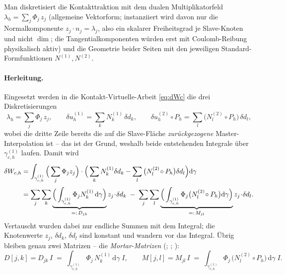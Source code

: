 \documentclass[a4paper,11pt]{article}
\def\bm#1{#1}%
\begin{document}
Man diskretisiert die Kontakttraktion mit dem dualen Multiplikatorfeld
$\bm\lambda_h = \sum_j \Phi_j\,\bm z_j$ (allgemeine Vektorform; instanziiert wird davon nur die
Normalkomponente $\bm z_j\!\cdot\!\bm n_j=\lambda_j$, also ein skalarer Freiheitsgrad je
Slave-Knoten und nicht $\dim$; die Tangentialkomponenten würden erst mit Coulomb-Reibung physikalisch
aktiv) und die Geometrie beider Seiten mit den jeweiligen
Standard-Formfunktionen $N^{(1)},N^{(2)}$.

\paragraph{Herleitung.} Eingesetzt werden in die Kontakt-Virtuelle-Arbeit \eqref{eq:dWc} die drei
Diskretisierungen
\begin{equation}
\bm\lambda_h=\sum_j \Phi_j\,\bm z_j,
\qquad
\delta\bm u_h^{(1)}=\sum_k N_k^{(1)}\,\delta\bm d_k,
\qquad
\delta\bm u_h^{(2)}\!\circ P_h=\sum_l \big(N_l^{(2)}\!\circ P_h\big)\,\delta\bm d_l ,
\label{eq:discr}
\end{equation}
wobei die dritte Zeile bereits die auf die Slave-Fläche \emph{zurückgezogene} Master-Interpolation
ist -- das ist der Grund, weshalb beide entstehenden Integrale über $\gamma_{c,h}^{(1)}$ laufen.
Damit wird
\begin{align}
\delta W_{c,h}
&= \int_{\gamma_{c,h}^{(1)}}\Big(\sum_j \Phi_j\bm z_j\Big)\cdot
   \Big(\sum_k N_k^{(1)}\delta\bm d_k - \sum_l \big(N_l^{(2)}\!\circ P_h\big)\delta\bm d_l\Big)\mathrm d\gamma
   \notag\\[2pt]
&= \sum_j\sum_k \underbrace{\Big(\int_{\gamma_{c,h}^{(1)}} \Phi_j N_k^{(1)}\,\mathrm d\gamma\Big)}_{=:\,D_{jk}}
   \bm z_j\!\cdot\!\delta\bm d_k
   \;-\;
   \sum_j\sum_l \underbrace{\Big(\int_{\gamma_{c,h}^{(1)}} \Phi_j \big(N_l^{(2)}\!\circ P_h\big)\mathrm d\gamma\Big)}_{=:\,M_{jl}}
   \bm z_j\!\cdot\!\delta\bm d_l .
\label{eq:dWc_diskret}
\end{align}
Vertauscht wurden dabei nur endliche Summen mit dem Integral; die Knotenwerte $\bm z_j$,
$\delta\bm d_k$, $\delta\bm d_l$ sind konstant und wandern vor das Integral. Übrig bleiben genau
zwei Matrizen -- die \emph{Mortar-Matrizen}
(\citealp[Gl.~(3.34)--(3.36)]{farah}; \citealp[Gl.~(3.5)--(3.6)]{popp2012}; \citealp[Gl.~(35)/(36)]{poppgeewall2009}):
\begin{equation}
\bm D[j,k] = D_{jk}\,\bm I \;=\; \int_{\gamma_{c,h}^{(1)}} \Phi_j\,N_k^{(1)}\,\mathrm d\gamma\;\bm I,
\qquad
\bm M[j,l] = M_{jl}\,\bm I \;=\; \int_{\gamma_{c,h}^{(1)}} \Phi_j\,\big(N_l^{(2)}\!\circ P_h\big)\,\mathrm d\gamma\;\bm I .
\label{eq:DM}
\end{equation}
\end{document}
